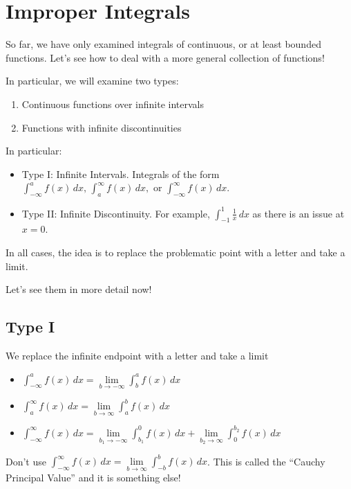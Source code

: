 \section{Improper Integrals}
So far, we have only examined integrals of continuous, or at
least bounded functions. Let's see how to deal with a more general
collection of functions!

In particular, we will examine two types:
\begin{enumerate}[label=(\arabic*)]
    \item Continuous functions over infinite intervals
    \item Functions with infinite discontinuities
\end{enumerate}

In particular:
\begin{itemize}
    \item Type I\@: Infinite Intervals. Integrals of the form
          $ \displaystyle \int_{-\infty}^{a} f(x)\, d{x},\,
              \int_{a}^{\infty} f(x)\, d{x},\text{ or }
              \int_{-\infty}^{\infty} f(x)\, d{x} $.
    \item Type II\@: Infinite Discontinuity. For example,
          $ \displaystyle \int_{-1}^{1} \frac{1}{x} \, d{x} $
          as there is an issue at $ x=0 $.
\end{itemize}

In all cases, the idea is to replace the problematic point with a
letter and take a limit.

Let's see them in more detail now!

\subsection*{Type I}
We replace the infinite endpoint with a letter and take a limit
\begin{itemize}
    \item $ \displaystyle \int_{-\infty}^{a} f(x)\, d{x} =\lim\limits_{{b} \to {-\infty}}
              \int_{b}^{a} f(x)\, d{x} $
    \item $ \displaystyle \int_{a}^{\infty} f(x)\, d{x} =\lim\limits_{{b} \to {\infty}}
              \int_{a}^{b} f(x)\, d{x} $
    \item $ \displaystyle  \int_{-\infty}^{\infty} f(x)\, d{x}=
              \lim\limits_{{b_1} \to {-\infty}} \int_{b_1}^{0} f(x)\, d{x}+
              \lim\limits_{{b_2} \to {\infty}} \int_{0}^{b_2} f(x)\, d{x} $
\end{itemize}
\begin{Remark}{}{}
    Don't use
    $ \displaystyle \int_{-\infty}^{\infty} f(x)\, d{x}=\lim\limits_{{b} \to {\infty}}
        \int_{-b}^{b} f(x)\, d{x} $.
    This is called the ``Cauchy Principal Value'' and it is something else!
\end{Remark}



